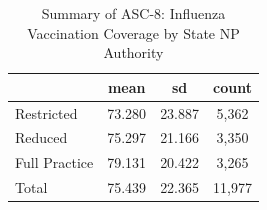 \begin{table}[htbp]\centering
\def\sym#1{\ifmmode^{#1}\else\(^{#1}\)\fi}
\caption{Summary of ASC-8: Influenza Vaccination Coverage by State NP Authority}
\begin{tabular}{l*{1}{ccc}}
\toprule
                    &        mean&          sd&       count\\
\midrule
Restricted          &      73.280&      23.887&       5,362\\
Reduced             &      75.297&      21.166&       3,350\\
Full Practice       &      79.131&      20.422&       3,265\\
Total               &      75.439&      22.365&      11,977\\
\bottomrule
\end{tabular}
\end{table}
